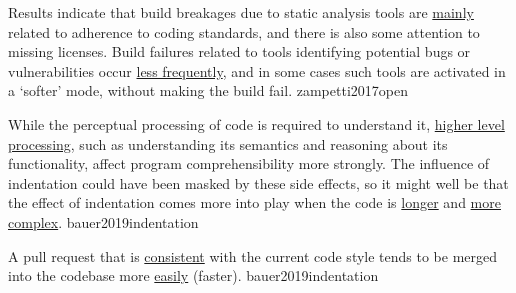 \documentclass{article}
\begin{document}
  {Results indicate that build breakages due to static analysis tools are \ul{mainly} related to adherence to coding standards, and there is also some attention to missing licenses. Build failures related to tools identifying potential bugs or vulnerabilities occur \ul{less frequently}, and in some cases such tools are activated in a `softer' mode, without making the build fail.}
  {zampetti2017open}

  {While the perceptual processing of code is required to understand it, \ul{higher level processing}, such as understanding its semantics and reasoning about its functionality, affect program comprehensibility more strongly. The influence of indentation could have been masked by these side effects, so it might well be that the effect of indentation comes more into play when the code is \ul{longer} and \ul{more complex}.}
  {bauer2019indentation}

  {A pull request that is \ul{consistent} with the current code style tends to be merged into the codebase more \ul{easily} (faster).}
  {bauer2019indentation}
\end{document}
